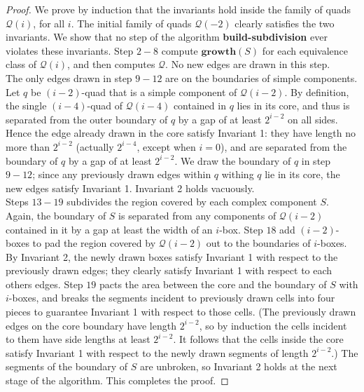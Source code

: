 \begin{proof}
We prove by induction that the invariants hold inside the family of quads $\mathcal{Q}(i)$, for all $i$. The initial family of quads $\mathcal{Q}(-2)$ clearly satisfies the two invariants. We show that no step of the algorithm \textbf{build-subdivision} ever violates these invariants. Step $2-8$ compute $\mathbf{growth}(S)$ for each equivalence class of $\mathcal{Q}(i)$, and then computes $\mathcal{Q}$. No new edges are drawn in this step.\\

The only edges drawn in step $9-12$ are on the boundaries of simple components. Let $q$ be $(i-2)$-quad that is a simple component of $\mathcal{Q}(i-2)$. By definition, the single $(i-4)$-quad of $\mathcal{Q}(i-4)$ contained in $q$ lies in its core, and thus is separated from the outer boundary of $q$ by a gap of at least $2^{i-2}$ on all sides. Hence the edge already drawn in the core satisfy Invariant 1: they have length no more than $2^{i-2}$ (actually $2^{i-4}$, except when $i=0$), and are separated from the boundary of $q$ by a gap of at least $2^{i-2}$. We draw the boundary of $q$ in step $9-12$; since any previously drawn edges within $q$ withing $q$ lie in its core, the new edges satisfy Invariant 1. Invariant 2 holds vacuously. \\

Steps $13-19$ subdivides the region covered by each complex component $S$. Again, the boundary of $S$ is separated from any components of $\mathcal{Q}(i-2)$ contained in it by a gap at least the width of an $i$-box. Step $18$ add $(i-2)$-boxes to pad the region covered by $\mathcal{Q}(i-2)$ out to the boundaries of $i$-boxes. By Invariant 2, the newly drawn boxes satisfy Invariant 1 with respect to the previously drawn edges; they clearly satisfy Invariant 1 with respect to each others edges. Step $19$ pacts the area between the core and the boundary of $S$ with $i$-boxes, and breaks the segments incident to previously drawn cells into four pieces to guarantee Invariant 1 with respect to those cells. (The previously drawn edges on the core boundary have length $2^{i-2}$, so by induction the cells incident to them have side lengths at least $2^{i-2}$. It follows that the cells inside the core satisfy Invariant 1 with respect to the newly drawn segments of length $2^{i-2}$.) The segments of the boundary of $S$ are unbroken, so Invariant 2 holds at the next stage of the algorithm. This completes the proof.
\end{proof}

